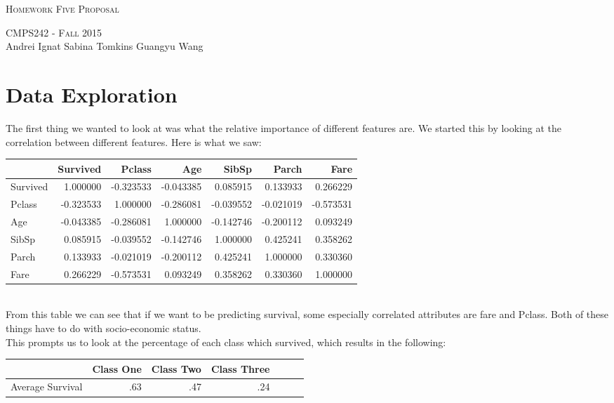 \documentclass{article}
\begin{document}
\begin{center}
\Huge{\textsc{Homework Five Proposal}} 

\Large\textsc{CMPS242 - Fall 2015}\\

\large{Andrei Ignat  \hfill Sabina Tomkins \hfill Guangyu Wang} 
\end{center}

\section*{Data Exploration}
The first thing we wanted to look at was what the relative importance of different features are. We started this by looking at the correlation between different features. Here is what we saw: 

\begin{tabular}{|l|r|r|r|r|r|r|}
\hline
 &  Survived &    Pclass &       Age &     SibSp &     Parch &      Fare \\
\hline
Survived &  1.000000 & -0.323533 & -0.043385 &  0.085915 &  0.133933 &  0.266229 \\
\hline
Pclass   & -0.323533 &  1.000000 & -0.286081 & -0.039552 & -0.021019 & -0.573531 \\
\hline
Age      & -0.043385 & -0.286081 &  1.000000 & -0.142746 & -0.200112 &  0.093249 \\
\hline
SibSp    &  0.085915 & -0.039552 & -0.142746 &  1.000000 &  0.425241 &  0.358262 \\
\hline
Parch    &  0.133933 & -0.021019 & -0.200112 &  0.425241 &  1.000000 &  0.330360 \\
\hline
Fare     &  0.266229 & -0.573531 &  0.093249 &  0.358262 &  0.330360 &  1.000000 \\
\hline
\end{tabular}\\


From this table we can see that if we want to be predicting survival, some especially correlated attributes are fare and Pclass. Both of these things have to do with socio-economic status. \\

This prompts us to look at the percentage of each class which survived, which results in the following:


\begin{tabular}{|l|r|r|r|r|r|r|}
\hline
&  Class One &    Class Two &       Class Three\\
\hline
Average Survival &  .63 & .47 & .24\\
\hline

\end{tabular}
\end{document}
